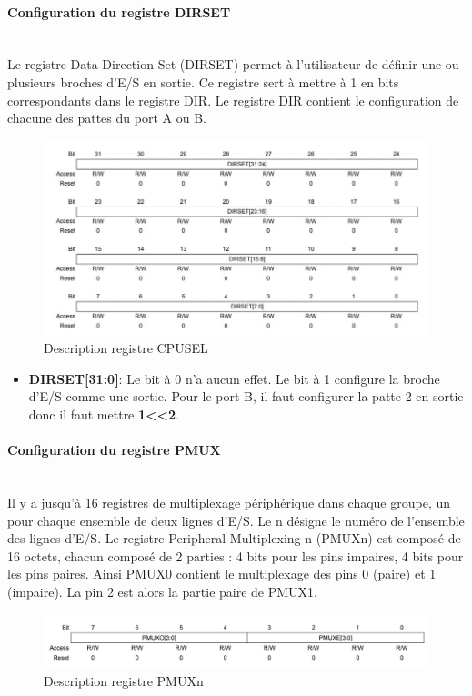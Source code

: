 \documentclass[a4paper]{article}
\begin{document}
	\paragraph{Configuration du registre DIRSET} 
	~~\\
	Le registre Data Direction Set (DIRSET) permet à l'utilisateur de définir une ou plusieurs broches d'E/S en sortie. Ce registre sert à mettre à 1 en bits correspondants dans le registre DIR. Le registre DIR contient le configuration de chacune des pattes du port A ou B.
	\begin{figure}[H]
		\centering
		\includegraphics[width=0.92\linewidth]{DIRSET.jpg}
		\caption{Description registre CPUSEL}
	\end{figure}
	\begin{itemize}
		\item {\bf DIRSET[31:0]}: Le bit à 0 n'a aucun effet. Le bit à 1 configure la broche d'E/S comme une sortie. Pour le port B, il faut configurer la patte 2 en sortie donc il faut mettre {\bf 1\textless\textless2}.
	\end{itemize}
	\newpage
	\paragraph{Configuration du registre PMUX} 
	~~\\
	Il y a jusqu'à 16 registres de multiplexage périphérique dans chaque groupe, un pour chaque ensemble de deux lignes d'E/S. Le n désigne le numéro de l'ensemble des lignes d'E/S.
	Le registre  Peripheral Multiplexing n (PMUXn) est composé de 16 octets, chacun composé de 2 parties : 4 bits pour les pins impaires, 4 bits pour les pins paires. Ainsi PMUX0 contient le multiplexage des pins 0 (paire) et 1 (impaire). La pin 2 est alors la partie paire de PMUX1.  
	\begin{figure}[H]
		\centering
		\includegraphics[width=0.9\linewidth]{PMUX.jpg}
		\caption{Description registre PMUXn}
	\end{figure}
	
\end{document}
